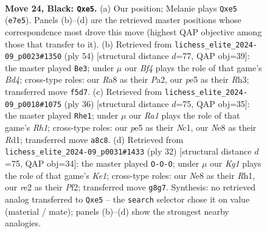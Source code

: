 \documentclass[11pt]{article}
\begin{document}
\clearpage

\begin{figure}[p]\centering
\begin{subfigure}{0.46\textwidth}\centering
\resizebox{\linewidth}{!}{%
\newchessgame
\chessboard[
  setfen={r2rn1k1/p1p1qp2/6p1/2PpPb1p/3N4/1P2P1P1/3BRP1P/Q2K1BR1 b - - 0 24},
  showmover=false,
  pgfstyle=straightmove, color=movearrow, markmove={e7-e5}
]}
\caption{}
\end{subfigure}\hfill
\begin{subfigure}{0.46\textwidth}\centering
\resizebox{\linewidth}{!}{%
\newchessgame
\chessboard[
  setfen={6rk/3rbpp1/p3p1np/1q2P2N/1p1B2Q1/1P5R/P5PP/4R2K w - - 4 28},
  showmover=false,
  pgfstyle=straightmove, color=movearrow, markmove={d4-e3}
]}
\caption{}
\end{subfigure}
\\[4pt]
\begin{subfigure}{0.46\textwidth}\centering
\resizebox{\linewidth}{!}{%
\newchessgame
\chessboard[
  setfen={r1r3k1/4ppbp/3p1np1/q7/1p1BP3/1P3P2/PP1Q2PP/1KNR3R w - - 3 19},
  showmover=false,
  pgfstyle=straightmove, color=movearrow, markmove={h1-e1}
]}
\caption{}
\end{subfigure}\hfill
\begin{subfigure}{0.46\textwidth}\centering
\resizebox{\linewidth}{!}{%
\newchessgame
\chessboard[
  setfen={2kr3r/pb1nq2p/1pp3p1/3p1p2/3P4/2NBPQ1P/PPP2P2/R3K2R w KQ - 2 17},
  showmover=false,
  pgfstyle=straightmove, color=movearrow, markmove={e1-c1}
]}
\caption{}
\end{subfigure}
\caption{\textbf{Move 24, Black: \texttt{Qxe5}.} (a) Our position; Melanie plays \texttt{Qxe5} (\texttt{e7e5}). Panels (b)--(d) are the retrieved master positions whose correspondence most drove this move (highest QAP objective among those that transfer to it). (b) Retrieved from \texttt{lichess\_elite\_2024-09\_p0023\#1350} (ply 54) [structural distance $d$=77, QAP obj=39]: the master played \texttt{Be3}; under $\mu$ our \emph{Bf4} plays the role of that game's \emph{Bd4}; cross-type roles: our \emph{R}a8 as their \emph{P}a2, our \emph{p}e5 as their \emph{R}h3; transferred move \texttt{f5d7}. (c) Retrieved from \texttt{lichess\_elite\_2024-09\_p0018\#1075} (ply 36) [structural distance $d$=75, QAP obj=35]: the master played \texttt{Rhe1}; under $\mu$ our \emph{Ra1} plays the role of that game's \emph{Rh1}; cross-type roles: our \emph{p}e5 as their \emph{N}c1, our \emph{N}e8 as their \emph{R}d1; transferred move \texttt{a8c8}. (d) Retrieved from \texttt{lichess\_elite\_2024-09\_p0031\#1433} (ply 32) [structural distance $d$=75, QAP obj=34]: the master played \texttt{O-O-O}; under $\mu$ our \emph{Kg1} plays the role of that game's \emph{Ke1}; cross-type roles: our \emph{N}e8 as their \emph{R}h1, our \emph{r}e2 as their \emph{P}f2; transferred move \texttt{g8g7}. Synthesis: no retrieved analog transferred to \texttt{Qxe5} -- the \texttt{search} selector chose it on value (material / mate); panels (b)--(d) show the strongest nearby analogies.}
\label{fig:thought-m47}
\end{figure}
\end{document}
